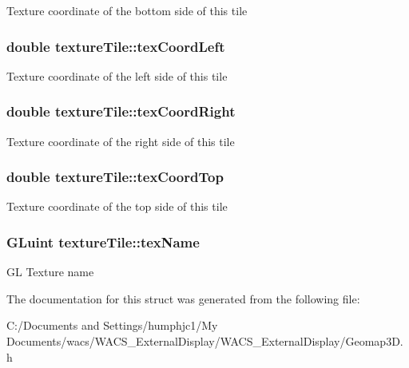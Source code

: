 \label{structtexture_tile_ab666fa6d9772547b6108181629b0bcc3}
Texture coordinate of the bottom side of this tile \hypertarget{structtexture_tile_ab061d3a02764d817e149fa5c88e809ab}{
\subsubsection[{texCoordLeft}]{\setlength{\rightskip}{0pt plus 5cm}double {\bf textureTile::texCoordLeft}}}
\label{structtexture_tile_ab061d3a02764d817e149fa5c88e809ab}
Texture coordinate of the left side of this tile \hypertarget{structtexture_tile_aa1d1ce9a19f9152c63f8495dfe1cb3d5}{
\subsubsection[{texCoordRight}]{\setlength{\rightskip}{0pt plus 5cm}double {\bf textureTile::texCoordRight}}}
\label{structtexture_tile_aa1d1ce9a19f9152c63f8495dfe1cb3d5}
Texture coordinate of the right side of this tile \hypertarget{structtexture_tile_a1edb8965ab455cfbca98fcdc4e81076c}{
\subsubsection[{texCoordTop}]{\setlength{\rightskip}{0pt plus 5cm}double {\bf textureTile::texCoordTop}}}
\label{structtexture_tile_a1edb8965ab455cfbca98fcdc4e81076c}
Texture coordinate of the top side of this tile \hypertarget{structtexture_tile_a11cd1eb0c320bce784e0545446a4dcfb}{
\subsubsection[{texName}]{\setlength{\rightskip}{0pt plus 5cm}GLuint {\bf textureTile::texName}}}
\label{structtexture_tile_a11cd1eb0c320bce784e0545446a4dcfb}
GL Texture name 

The documentation for this struct was generated from the following file:\begin{DoxyCompactItemize}
\item 
C:/Documents and Settings/humphjc1/My Documents/wacs/WACS\_\-ExternalDisplay/WACS\_\-ExternalDisplay/Geomap3D.h\end{DoxyCompactItemize}
